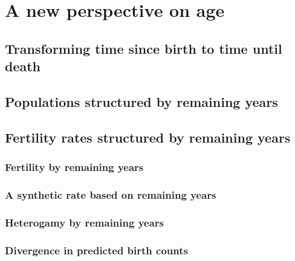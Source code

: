 \chapter{A new perspective on age}
  
  
  \section{Transforming time since birth to time until death}
    
    
  \section{Populations structured by remaining years}
    
  
  \section{Fertility rates structured by remaining years}
    
    
    \subsection{Fertility by remaining years}
      
      
    \subsection{A synthetic rate based on remaining years}
      
    
    \subsection{Heterogamy by remaining years}
      
      
    \subsection{Divergence in predicted birth counts}
      
      

